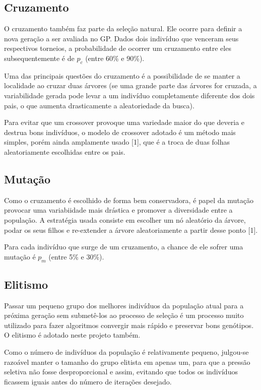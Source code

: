\documentclass[11pt]{article}
\begin{document}
\subsection*{Cruzamento}

O cruzamento também faz parte da seleção natural. Ele ocorre para definir a nova geração a ser avaliada no GP. Dados dois indivíduo que venceram seus respectivos torneios, a probabilidade de ocorrer um cruzamento entre eles subsequentemente é de $p_c$ (entre 60\% e 90\%).

Uma das principais questões do cruzamento é a possibilidade de se manter a localidade ao cruzar duas árvores (se 	uma grande parte das árvores for cruzada, a variabilidade gerada pode levar a um indivíduo completamente diferente dos dois pais, o que aumenta drasticamente a aleatoriedade da busca).

Para evitar que um crossover provoque uma variedade maior do que deveria e destrua bons indivíduos, o modelo de crossover adotado é um método mais simples, porém ainda amplamente usado [1], que é a troca de duas folhas aleatoriamente escolhidas entre os pais.

\subsection*{Mutação}

Como o cruzamento é escolhido de forma bem conservadora, é papel da mutação provocar uma variabiidade mais drástica e promover a diversidade entre a população. A estratégia usada consiste em escolher um nó aleatório da árvore, podar os seus filhos e re-extender a árvore aleatoriamente a partir desse ponto [1].

Para cada indivíduo que surge de um cruzamento, a chance de ele sofrer uma mutação é $p_m$ (entre 5\% e 30\%).

\subsection*{Elitismo}

Passar um pequeno grupo dos melhores indivíduos da população atual para a próxima geração sem submetê-los ao processo de seleção é um processo muito utilizado para fazer algoritmos convergir mais rápido e preservar bons genótipos. O elitismo é adotado neste projeto também.

Como o número de indivíduos da população é relativamente pequeno, julgou-se razoável manter o tamanho do grupo elitista em apenas um, para que a pressão seletiva não fosse desproporcional e assim, evitando que todos os indivíduos ficassem iguais antes do número de iterações desejado.
\end{document}
